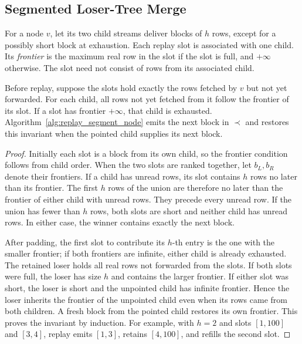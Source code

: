 \subsection{Segmented Loser-Tree Merge}
\label{app:proof-lt}

For a node $v$, let its two child streams deliver blocks of $h$ rows, except for a possibly short block at exhaustion. Each replay slot is associated with one child. Its \emph{frontier} is the maximum real row in the slot if the slot is full, and $+\infty$ otherwise. The slot need not consist of rows from its associated child.

\begin{lemma}
Before replay, suppose the slots hold exactly the rows fetched by $v$ but not yet forwarded. For each child, all rows not yet fetched from it follow the frontier of its slot. If a slot has frontier $+\infty$, that child is exhausted. Algorithm~\ref{alg:replay_segment_node} emits the next block in $\prec$ and restores this invariant when the pointed child supplies its next block.
\end{lemma}
\begin{proof}
Initially each slot is a block from its own child, so the frontier condition follows from child order. When the two slots are ranked together, let $b_L,b_R$ denote their frontiers. If a child has unread rows, its slot contains $h$ rows no later than its frontier. The first $h$ rows of the union are therefore no later than the frontier of either child with unread rows. They precede every unread row. If the union has fewer than $h$ rows, both slots are short and neither child has unread rows. In either case, the winner contains exactly the next block.

After padding, the first slot to contribute its $h$-th entry is the one with the smaller frontier; if both frontiers are infinite, either child is already exhausted. The retained loser holds all real rows not forwarded from the slots. If both slots were full, the loser has size $h$ and contains the larger frontier. If either slot was short, the loser is short and the unpointed child has infinite frontier. Hence the loser inherits the frontier of the unpointed child even when its rows came from both children. A fresh block from the pointed child restores its own frontier. This proves the invariant by induction. For example, with $h=2$ and slots $[1,100]$ and $[3,4]$, replay emits $[1,3]$, retains $[4,100]$, and refills the second slot.
\end{proof}

